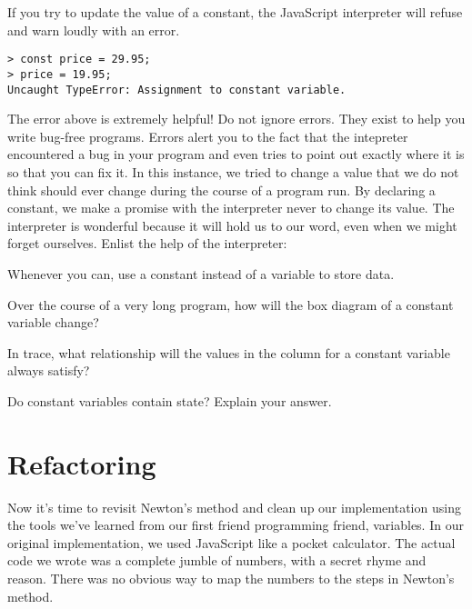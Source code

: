 If you try to update the value of a constant, the JavaScript interpreter will
refuse and warn loudly with an error.

\begin{lstlisting}
> const price = 29.95;
> price = 19.95;
Uncaught TypeError: Assignment to constant variable.
\end{lstlisting}

The error above is extremely helpful! Do not ignore errors. They exist to help
you write bug-free programs. Errors alert you to the fact that the intepreter
encountered a bug in your program and even tries to point out exactly where it
is so that you can fix it. In this instance, we tried to change a value that we
do not think should ever change during the course of a program run. By declaring
a constant, we make a promise with the interpreter never to change its value.
The interpreter is wonderful because it will hold us to our word, even when we
might forget ourselves. Enlist the help of the interpreter:

\begin{center}
  Whenever you can, use a constant instead of a variable to store data.
\end{center}

\begin{question}
Over the course of a very long program, how will the box diagram of a constant
variable change?
\end{question}

\begin{question}
In trace, what relationship will the values in the column for a constant
variable always satisfy?
\end{question}

\begin{question}
  Do constant variables contain state? Explain your answer.
\end{question}


\section{Refactoring}
Now it's time to revisit Newton's method and clean up our implementation using
the tools we've learned from our first friend programming friend, variables. In
our original implementation, we used JavaScript like a pocket calculator. The
actual code we wrote was a complete jumble of numbers, with a secret rhyme and
reason. There was no obvious way to map the numbers to the steps in Newton's
method.

